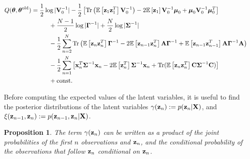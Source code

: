 \documentclass[11pt]{article}
\newtheorem{proposition}{Proposition}[section]
\begin{document}
\begin{align}
	Q(\boldsymbol\theta, \boldsymbol\theta^\text{old}) &= \frac{1}{2}\log \vert
	  {\bf V}_0^{-1}\vert -\frac{1}{2}\left[\text{Tr}\left(\mathbb{E}\left[{\bf z}_1 {\bf z}_1^T\right] {\bf V}_0^{-1}\right) -2 \mathbb{E}\left[{\bf z}_1\right]{\bf V}_0^{-1}\boldsymbol\mu_0 + \boldsymbol\mu_0 {\bf V}_0^{-1}\boldsymbol\mu_0^T\right] \nonumber \\
	  &\hspace{1cm}+ \frac{N-1}{2}\log\vert\boldsymbol\Gamma^{-1}\vert + \frac{N}{2}\log\vert \boldsymbol\Sigma^{-1}\vert \nonumber \\
	  &\hspace{1cm}-\frac{1}{2} \sum_{n=2}^{N}\text{Tr}\left(\mathbb{E}\left[{\bf z}_n{\bf z}_n^T\right]\boldsymbol\Gamma^{-1} -2\mathbb{E}\left[ {\bf z}_{n-1}{\bf z}_n^T\right]{\bf A}\boldsymbol\Gamma^{-1} + \mathbb{E}\left[{\bf z}_{n-1}{\bf z}_{n-1}^T\right]{\bf A}\boldsymbol\Gamma^{-1}{\bf A}\right) \nonumber\\
	  &\hspace{1cm}-\frac{1}{2}\sum_{n=1}^N\left[{\bf x}_n^T\boldsymbol{\Sigma}^{-1}{\bf x}_n-2\mathbb{E}\left[{\bf z}_n^T\right]\boldsymbol\Sigma^{-1}{\bf x}_n + \text{Tr}(\mathbb{E}\left[{\bf z}_n{\bf z}_n^T\right]{\bf C}\boldsymbol\Sigma^{-1}{\bf C})\right] \nonumber\\
	  &\hspace{1cm} + \text{const.}
\end{align}

Before computing the expected values of the latent variables, it is useful to find the posterior distributions of the latent variables $\gamma({\bf z}_n) := p({\bf z}_n\vert {\bf X})$, and $\xi({\bf z}_{n-1}, {\bf z}_{n}) := p({\bf z}_{n-1}, {\bf z}_n\vert {\bf X})$.

\begin{proposition}
	The term $\gamma({\bf z}_n)$ can be written as a product of the joint probabilities of the first $n$ observations and ${\bf z}_n$, and the conditional probability of the observations that follow ${\bf z}_n$ conditional on ${\bf z}_n$.
\end{proposition}
\end{document}
